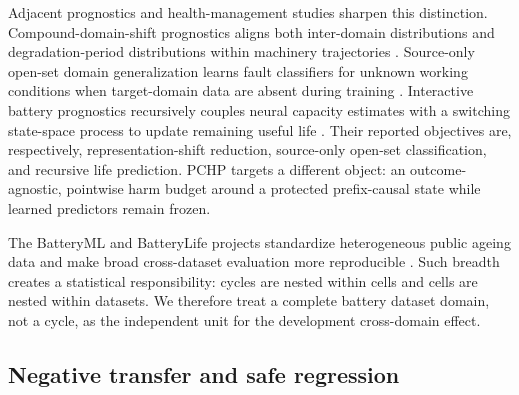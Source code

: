 \documentclass[11pt]{article}
\begin{document}
Adjacent prognostics and health-management studies sharpen this distinction. Compound-domain-shift prognostics aligns both inter-domain distributions and degradation-period distributions within machinery trajectories \citep{ding2023compound}. Source-only open-set domain generalization learns fault classifiers for unknown working conditions when target-domain data are absent during training \citep{song2026regroupment}. Interactive battery prognostics recursively couples neural capacity estimates with a switching state-space process to update remaining useful life \citep{duan2025interactive}. Their reported objectives are, respectively, representation-shift reduction, source-only open-set classification, and recursive life prediction. PCHP targets a different object: an outcome-agnostic, pointwise harm budget around a protected prefix-causal state while learned predictors remain frozen.

The BatteryML and BatteryLife projects standardize heterogeneous public ageing data and make broad cross-dataset evaluation more reproducible \citep{zhang2024batteryml,tan2025batterylife}. Such breadth creates a statistical responsibility: cycles are nested within cells and cells are nested within datasets. We therefore treat a complete battery dataset domain, not a cycle, as the independent unit for the development cross-domain effect.

\subsection{Negative transfer and safe regression}
\end{document}
